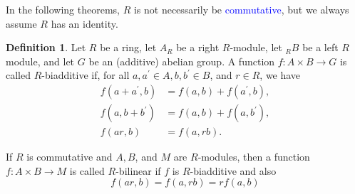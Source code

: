 \documentclass[a4paper,12pt]{article}
\newcommand{\blue}[1]{\textcolor{blue}{#1}}
\theoremstyle{definition}
\newtheorem{defn}{Definition}[subsection]
\begin{document}
\newpage
In the following theorems, $R$ is not necessarily be \blue{commutative}, but we always assume $R$ has an identity.
\begin{defn}
    Let $R$ be a ring, let $A_R$ be a right $R$-module, let ${ }_R B$ be a left $R$ module, and let $G$ be an (additive) abelian group. A function $f: A \times B \rightarrow G$ is called $R$-biadditive if, for all $a, a^{\prime} \in A, b, b^{\prime} \in B$, and $r \in R$, we have
    $$
        \begin{aligned}
            f\left(a+a^{\prime}, b\right) & =f(a, b)+f\left(a^{\prime}, b\right), \\
            f\left(a, b+b^{\prime}\right) & =f(a, b)+f\left(a, b^{\prime}\right), \\
            f(a r, b)                     & =f(a, r b) .
        \end{aligned}
    $$

    If $R$ is commutative and $A, B$, and $M$ are $R$-modules, then a function $f: A \times B \rightarrow M$ is called $R$-bilinear if $f$ is $R$-biadditive and also
    $$
        f(a r, b)=f(a, r b)=r f(a, b)
    $$
\end{defn}
\end{document}
